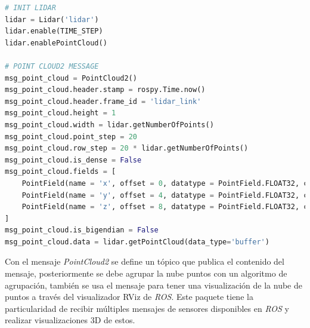\hfill
\begin{lstlisting}[language=Python]
# INIT LIDAR
lidar = Lidar('lidar')          
lidar.enable(TIME_STEP)
lidar.enablePointCloud()

# POINT CLOUD2 MESSAGE 
msg_point_cloud = PointCloud2()
msg_point_cloud.header.stamp = rospy.Time.now()
msg_point_cloud.header.frame_id = 'lidar_link'  
msg_point_cloud.height = 1
msg_point_cloud.width = lidar.getNumberOfPoints()
msg_point_cloud.point_step = 20
msg_point_cloud.row_step = 20 * lidar.getNumberOfPoints()
msg_point_cloud.is_dense = False
msg_point_cloud.fields = [
    PointField(name = 'x', offset = 0, datatype = PointField.FLOAT32, count = 1),
    PointField(name = 'y', offset = 4, datatype = PointField.FLOAT32, count = 1),
    PointField(name = 'z', offset = 8, datatype = PointField.FLOAT32, count = 1),
]
msg_point_cloud.is_bigendian = False
msg_point_cloud.data = lidar.getPointCloud(data_type='buffer')       
\end{lstlisting}
\hfill

Con el mensaje \textit{PointCloud2} se define un tópico que publica el contenido del mensaje, posteriormente se debe agrupar la nube puntos con un algoritmo de agrupación, también se usa el mensaje para tener una visualización de la nube de puntos a través del visualizador RViz de \textit{ROS}. Este paquete tiene la particularidad de recibir múltiples mensajes de sensores disponibles en \textit{ROS} y realizar visualizaciones 3D de estos. 

